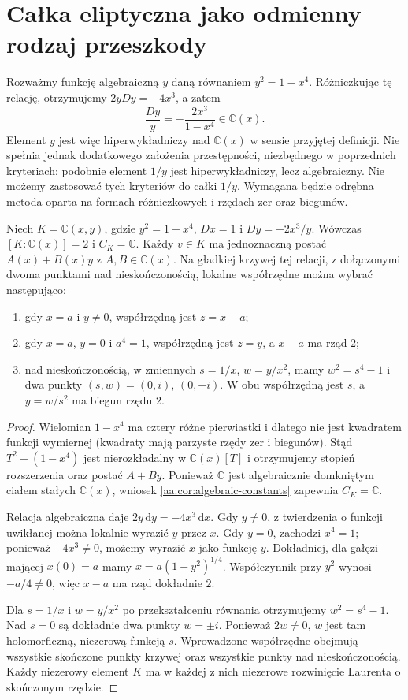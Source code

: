 \section{Całka eliptyczna jako odmienny rodzaj przeszkody}

Rozważmy funkcję algebraiczną $y$ daną
równaniem $y^2=1-x^4$. Różniczkując tę relację,
otrzymujemy $2yDy=-4x^3$, a zatem
\[
 \frac{Dy}{y}=-\frac{2x^3}{1-x^4}\in\mathbb C(x).
\]
Element $y$ jest więc hiperwykładniczy nad $\mathbb C(x)$
w sensie przyjętej definicji. Nie spełnia jednak
dodatkowego założenia przestępności, niezbędnego
w poprzednich kryteriach; podobnie element $1/y$
jest hiperwykładniczy, lecz algebraiczny.
Nie możemy zastosować tych kryteriów do całki $1/y$.
Wymagana będzie odrębna metoda oparta
na formach różniczkowych i rzędach
zer oraz biegunów.

\begin{lemat}
\label{aa:lem:elliptic-charts}
Niech $K=\mathbb C(x,y)$, gdzie
$y^2=1-x^4$, $Dx=1$ i
$Dy=-2x^3/y$. Wówczas $[K:\mathbb C(x)]=2$
i $C_K=\mathbb C$. Każdy $v\in K$
ma jednoznaczną postać $A(x)+B(x)y$
z $A,B\in\mathbb C(x)$.
Na gładkiej krzywej tej relacji,
z dołączonymi dwoma punktami
nad nieskończonością, lokalne współrzędne
można wybrać następująco:
\begin{enumerate}
\item gdy $x=a$ i $y\ne0$, współrzędną
jest $z=x-a$;
\item gdy $x=a$, $y=0$ i $a^4=1$,
współrzędną jest $z=y$, a $x-a$
ma rząd $2$;
\item nad nieskończonością, w zmiennych
$s=1/x$, $w=y/x^2$,
mamy $w^2=s^4-1$ i dwa punkty
$(s,w)=(0,i)$, $(0,-i)$.
W obu współrzędną jest $s$, a
$y=w/s^2$ ma biegun rzędu $2$.
\end{enumerate}
\end{lemat}
\begin{proof}
Wielomian $1-x^4$ ma cztery różne
pierwiastki i dlatego nie jest
kwadratem funkcji wymiernej
(kwadraty mają parzyste rzędy
zer i biegunów). Stąd
$T^2-(1-x^4)$ jest nierozkładalny
w $\mathbb C(x)[T]$ i otrzymujemy
stopień rozszerzenia oraz
postać $A+By$. Ponieważ
$\mathbb C$ jest algebraicznie
domkniętym ciałem stałych
$\mathbb C(x)$, wniosek
\ref{aa:cor:algebraic-constants}
zapewnia $C_K=\mathbb C$.

Relacja algebraiczna daje
$2y\,\mathrm dy=-4x^3\,\mathrm dx$.
Gdy $y\ne0$, z twierdzenia
o funkcji uwikłanej można
lokalnie wyrazić $y$ przez $x$.
Gdy $y=0$, zachodzi $x^4=1$;
ponieważ $-4x^3\ne0$, możemy
wyrazić $x$ jako funkcję $y$.
Dokładniej, dla gałęzi mającej
$x(0)=a$ mamy
$x=a(1-y^2)^{1/4}$.
Współczynnik przy $y^2$
wynosi $-a/4\ne0$, więc
$x-a$ ma rząd dokładnie $2$.

Dla $s=1/x$ i $w=y/x^2$
po przekształceniu równania
otrzymujemy $w^2=s^4-1$.
Nad $s=0$ są dokładnie dwa
punkty $w=\pm i$. Ponieważ
$2w\ne0$, $w$ jest tam
holomorficzną, niezerową
funkcją $s$.
Wprowadzone współrzędne
obejmują wszystkie skończone
punkty krzywej oraz wszystkie
punkty nad nieskończonością.
Każdy niezerowy element $K$
ma w każdej z nich
niezerowe rozwinięcie Laurenta
o skończonym rzędzie.
\end{proof}


